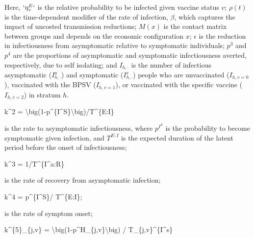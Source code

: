\documentclass[
]{article}
\newenvironment{Shaded}{\begin{snugshade}}{\end{snugshade}}
\newcommand{\NormalTok}[1]{#1}
\begin{document}
Here, \(`\eta^{E}_{v}`\) is the relative probability to be infected given vaccine status \(v\); \(\rho(t)\) is the time-dependent modifier of the rate of infection, \(\beta\), which captures the impact of uncosted transmission reductions; \(M(x)\) is the contact matrix between groups and depends on the economic configuration \(x\); \(\epsilon\) is the reduction in infectiousness from asymptomatic relative to symptomatic individuals; \(p^3\) and \(p^4\) are the proportions of asymptomatic and symptomatic infectiousness averted, respectively, due to self isolating; and \(I_{h,\cdot}^{\cdot}\) is the number of infectious asymptomatic (\(I_{h,\cdot}^{a}\)) and symptomatic (\(I_{h,\cdot}^{s}\)) people who are unvaccinated (\(I_{h,v=0}^{\cdot}\)), vaccinated with the BPSV (\(I_{h,v=1}^{\cdot}\)), or vaccinated with the specific vaccine (\(I_{h,v=2}^{\cdot}\)) in stratum \(h\).

\begin{Shaded}
\begin{Highlighting}[]
\NormalTok{ k\^{}2 = \textbackslash{}big(1{-}p\^{}\{I\^{}S\}\textbackslash{}big)/T\^{}\{E:I\} }
\end{Highlighting}
\end{Shaded}

is the rate to asymptomatic infectiousness, where \(p^{I^S}\) is the probability to become symptomatic given infection, and \(T^{E:I}\) is the expected duration of the latent period before the onset of infectiousness;

\begin{Shaded}
\begin{Highlighting}[]
\NormalTok{ k\^{}3 = 1/T\^{}\{I\^{}a:R\}  }
\end{Highlighting}
\end{Shaded}

is the rate of recovery from asymptomatic infection;

\begin{Shaded}
\begin{Highlighting}[]
\NormalTok{ k\^{}4 = p\^{}\{I\^{}S\}/ T\^{}\{E:I\}; }
\end{Highlighting}
\end{Shaded}

is the rate of symptom onset;

\begin{Shaded}
\begin{Highlighting}[]
\NormalTok{k\^{}\{5\}\_\{j,v\} =  \textbackslash{}big(1{-}p\^{}H\_\{j,v\}\textbackslash{}big) / T\_\{j,v\}\^{}\{I\^{}s\}}
\end{Highlighting}
\end{Shaded}
\end{document}

